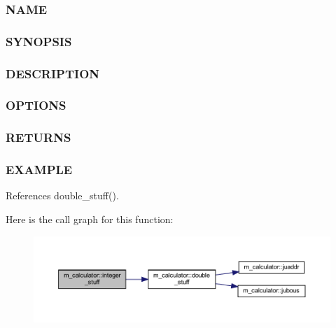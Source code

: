\subsubsection*{N\+A\+ME}

\subsubsection*{S\+Y\+N\+O\+P\+S\+IS}

\subsubsection*{D\+E\+S\+C\+R\+I\+P\+T\+I\+ON}

\subsubsection*{O\+P\+T\+I\+O\+NS}

\subsubsection*{R\+E\+T\+U\+R\+NS}

\subsubsection*{E\+X\+A\+M\+P\+LE}

References double\+\_\+stuff().

Here is the call graph for this function\+:
\nopagebreak
\begin{figure}[H]
\begin{center}
\leavevmode
\includegraphics[width=350pt]{namespacem__calculator_ae760c3bf7e4e933427bad6c92cd16dfb_cgraph}
\end{center}
\end{figure}
\mbox{\label{namespacem__calculator_a9306409f00c5ba6200bb68ca672b6053}} 
